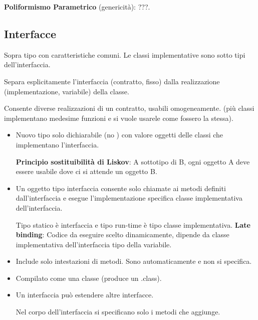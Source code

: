 \textbf{Poliformismo Parametrico} (genericità): ???.




\subsection{Interfacce}
Sopra tipo con caratteristiche comuni. Le classi implementative sono sotto tipi dell'interfaccia.

\bigskip

Separa esplicitamente l'interfaccia (contratto, fisso) dalla realizzazione (implementazione, variabile) della classe.

Consente diverse realizzazioni di un contratto, usabili omogeneamente. (più classi implementano medesime funzioni e si vuole usarele come fossero la stessa).


\begin{itemize}
	\item Nuovo tipo solo dichiarabile (no ) con valore oggetti delle classi che implementano l'interfaccia.

	\textbf{Principio sostituibilità di Liskov}: A sottotipo di B, ogni oggetto A deve essere usabile dove ci si attende un oggetto B.
	\item Un oggetto tipo interfaccia consente solo chiamate ai metodi definiti dall'interfaccia e esegue l'implementazione specifica classe implementativa dell'interfaccia.


	Tipo statico è interfaccia e tipo run-time è tipo classe implementativa.
	\textbf{Late binding}: Codice da eseguire scelto dinamicamente, dipende da classe implementativa dell'interfaccia tipo della variabile.

	\item Include solo intestazioni di metodi. Sono automaticamente  e non si specifica.
	\item Compilato come una classe (produce un .class).

	\item Un interfaccia può estendere altre interfacce.


	Nel corpo dell'interfaccia si specificano solo i metodi che aggiunge.
\end{itemize}

